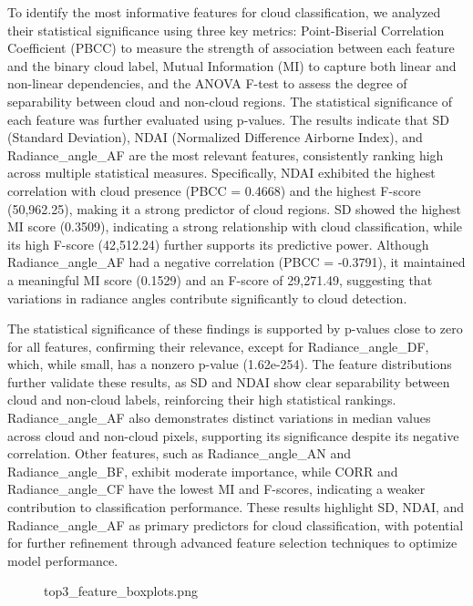 \documentclass[11pt]{article}
\begin{document}
To identify the most informative features for cloud classification, we
analyzed their statistical significance using three key metrics:
Point-Biserial Correlation Coefficient (PBCC) to measure the strength of
association between each feature and the binary cloud label, Mutual
Information (MI) to capture both linear and non-linear dependencies, and
the ANOVA F-test to assess the degree of separability between cloud and
non-cloud regions. The statistical significance of each feature was
further evaluated using p-values. The results indicate that SD (Standard
Deviation), NDAI (Normalized Difference Airborne Index), and
Radiance\_angle\_AF are the most relevant features, consistently ranking
high across multiple statistical measures. Specifically, NDAI exhibited
the highest correlation with cloud presence (PBCC = 0.4668) and the
highest F-score (50,962.25), making it a strong predictor of cloud
regions. SD showed the highest MI score (0.3509), indicating a strong
relationship with cloud classification, while its high F-score
(42,512.24) further supports its predictive power. Although
Radiance\_angle\_AF had a negative correlation (PBCC = -0.3791), it
maintained a meaningful MI score (0.1529) and an F-score of 29,271.49,
suggesting that variations in radiance angles contribute significantly
to cloud detection.

The statistical significance of these findings is supported by p-values
close to zero for all features, confirming their relevance, except for
Radiance\_angle\_DF, which, while small, has a nonzero p-value
(1.62e-254). The feature distributions further validate these results,
as SD and NDAI show clear separability between cloud and non-cloud
labels, reinforcing their high statistical rankings. Radiance\_angle\_AF
also demonstrates distinct variations in median values across cloud and
non-cloud pixels, supporting its significance despite its negative
correlation. Other features, such as Radiance\_angle\_AN and
Radiance\_angle\_BF, exhibit moderate importance, while CORR and
Radiance\_angle\_CF have the lowest MI and F-scores, indicating a weaker
contribution to classification performance. These results highlight SD,
NDAI, and Radiance\_angle\_AF as primary predictors for cloud
classification, with potential for further refinement through advanced
feature selection techniques to optimize model performance.

\begin{figure}
\centering
{}
\caption{top3\_feature\_boxplots.png}
\end{figure}
\end{document}
